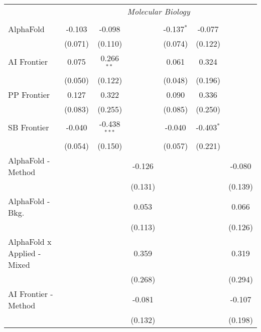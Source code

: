\begin{tabular}{lcccccc}
 & \multicolumn{6}{c}{\textit{Molecular Biology}} \\ \\
   AlphaFold                     & -0.103  & -0.098         &               & -0.137$^{*}$ & -0.077       &   \\   
                                 & (0.071) & (0.110)        &               & (0.074)      & (0.122)      &   \\   
   AI Frontier                   & 0.075   & 0.266$^{**}$   &               & 0.061        & 0.324        &   \\   
                                 & (0.050) & (0.122)        &               & (0.048)      & (0.196)      &   \\   
   PP Frontier                   & 0.127   & 0.322          &               & 0.090        & 0.336        &   \\   
                                 & (0.083) & (0.255)        &               & (0.085)      & (0.250)      &   \\   
   SB Frontier                   & -0.040  & -0.438$^{***}$ &               & -0.040       & -0.403$^{*}$ &   \\   
                                 & (0.054) & (0.150)        &               & (0.057)      & (0.221)      &   \\   
   AlphaFold - Method            &         &                & -0.126        &              &              & -0.080\\   
                                 &         &                & (0.131)       &              &              & (0.139)\\   
   AlphaFold - Bkg.              &         &                & 0.053         &              &              & 0.066\\   
                                 &         &                & (0.113)       &              &              & (0.126)\\   
   AlphaFold x Applied - Mixed   &         &                & 0.359         &              &              & 0.319\\   
                                 &         &                & (0.268)       &              &              & (0.294)\\   
   AI Frontier - Method          &         &                & -0.081        &              &              & -0.107\\   
                                 &         &                & (0.132)       &              &              & (0.198)\\   

\end{tabular}
